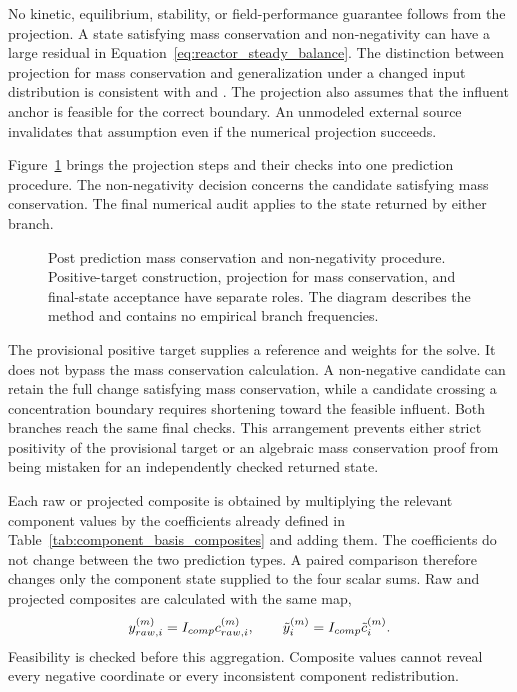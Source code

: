 No kinetic, equilibrium, stability, or field-performance guarantee follows from the projection. A state satisfying mass conservation and non-negativity can have a large residual in Equation~\eqref{eq:reactor_steady_balance}. The distinction between projection for mass conservation and generalization under a changed input distribution is consistent with \citet{Shen2023} and \citet{Valente2025}. The projection also assumes that the influent anchor is feasible for the correct boundary. An unmodeled external source invalidates that assumption even if the numerical projection succeeds.

Figure~\ref{fig:projection_acceptance_flow} brings the projection steps and their checks into one prediction procedure. The non-negativity decision concerns the candidate satisfying mass conservation. The final numerical audit applies to the state returned by either branch.

\begin{figure}[htbp]
\centering

\caption{Post prediction mass conservation and non-negativity procedure. Positive-target construction, projection for mass conservation, and final-state acceptance have separate roles. The diagram describes the method and contains no empirical branch frequencies.}
\label{fig:projection_acceptance_flow}
\end{figure}

The provisional positive target supplies a reference and weights for the solve. It does not bypass the mass conservation calculation. A non-negative candidate can retain the full change satisfying mass conservation, while a candidate crossing a concentration boundary requires shortening toward the feasible influent. Both branches reach the same final checks. This arrangement prevents either strict positivity of the provisional target or an algebraic mass conservation proof from being mistaken for an independently checked returned state.

Each raw or projected composite is obtained by multiplying the relevant component values by the coefficients already defined in Table~\ref{tab:component_basis_composites} and adding them. The coefficients do not change between the two prediction types. A paired comparison therefore changes only the component state supplied to the four scalar sums. Raw and projected composites are calculated with the same map,
\begin{equation}
\equationname{Raw and projected water-quality composites}
y_{raw,i}^{(m)}=I_{comp}c_{raw,i}^{(m)},\qquad
\tilde y_i^{(m)}=I_{comp}\tilde c_i^{(m)}.
\label{eq:projection_paired_composites}
\end{equation}
Feasibility is checked before this aggregation. Composite values cannot reveal every negative coordinate or every inconsistent component redistribution.

